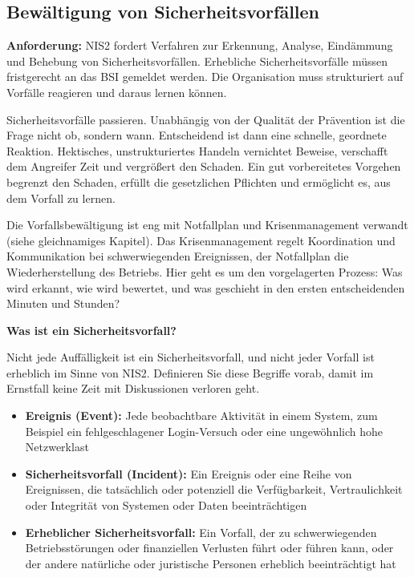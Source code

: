\newpage
\subsection{Bewältigung von Sicherheitsvorfällen}

\textbf{Anforderung:} NIS2 fordert Verfahren zur Erkennung, Analyse, Eindämmung und Behebung von Sicherheitsvorfällen. Erhebliche Sicherheitsvorfälle müssen fristgerecht an das BSI gemeldet werden. Die Organisation muss strukturiert auf Vorfälle reagieren und daraus lernen können.

Sicherheitsvorfälle passieren. Unabhängig von der Qualität der Prävention ist die Frage nicht ob, sondern wann. Entscheidend ist dann eine schnelle, geordnete Reaktion. Hektisches, unstrukturiertes Handeln vernichtet Beweise, verschafft dem Angreifer Zeit und vergrößert den Schaden. Ein gut vorbereitetes Vorgehen begrenzt den Schaden, erfüllt die gesetzlichen Pflichten und ermöglicht es, aus dem Vorfall zu lernen.

Die Vorfallsbewältigung ist eng mit Notfallplan und Krisenmanagement verwandt (siehe gleichnamiges Kapitel). Das Krisenmanagement regelt Koordination und Kommunikation bei schwerwiegenden Ereignissen, der Notfallplan die Wiederherstellung des Betriebs. Hier geht es um den vorgelagerten Prozess: Was wird erkannt, wie wird bewertet, und was geschieht in den ersten entscheidenden Minuten und Stunden?

\textbf{Was ist ein Sicherheitsvorfall?}

Nicht jede Auffälligkeit ist ein Sicherheitsvorfall, und nicht jeder Vorfall ist erheblich im Sinne von NIS2. Definieren Sie diese Begriffe vorab, damit im Ernstfall keine Zeit mit Diskussionen verloren geht.

\begin{itemize}
    \item \textbf{Ereignis (Event):} Jede beobachtbare Aktivität in einem System, zum Beispiel ein fehlgeschlagener Login-Versuch oder eine ungewöhnlich hohe Netzwerklast
    \item \textbf{Sicherheitsvorfall (Incident):} Ein Ereignis oder eine Reihe von Ereignissen, die tatsächlich oder potenziell die Verfügbarkeit, Vertraulichkeit oder Integrität von Systemen oder Daten beeinträchtigen
    \item \textbf{Erheblicher Sicherheitsvorfall:} Ein Vorfall, der zu schwerwiegenden Betriebsstörungen oder finanziellen Verlusten führt oder führen kann, oder der andere natürliche oder juristische Personen erheblich beeinträchtigt hat
\end{itemize}

